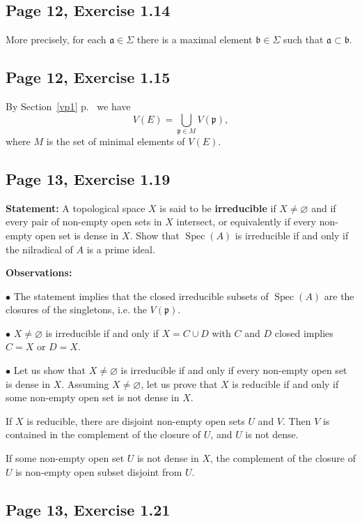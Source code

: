 \documentclass[parskip=half,fontsize=12pt]{scrartcl}%
\newcommand{\mf}{\mathfrak}
\newcommand{\bbb}{\mf b}
\newcommand{\ppp}{\mf p}
\newcommand{\bu}{\bullet}
\newcommand{\Spec}{\operatorname{Spec}}\newcommand{\Sp}{\operatorname{Spec}}
\begin{document}
\subsection{Page 12, Exercise 1.14}\label{114}%

More precisely, for each $\mf a\in\Sigma$ there is a maximal element $\bbb\in\Sigma$ such that $\mf a\subset\bbb$.

\subsection{Page 12, Exercise 1.15}\label{vp2}%

By Section~\ref{vp1} p.~\pageref{vp1} we have 
$$
V(E)=\bigcup_{\ppp\in M}V(\ppp),
$$ 
where $M$ is the set of minimal elements of $V(E)$.

\subsection{Page 13, Exercise 1.19}\label{irr}%

\textbf{Statement:} A topological space $X$ is said to be \textbf{irreducible} if $X\ne\varnothing$ and if every pair of non-empty open sets in $X$ intersect, or equivalently if every non-empty open set is dense in $X$. Show that $\Spec(A)$ is irreducible if and only if the nilradical of $A$ is a prime ideal.

\textbf{Observations:}

$\bu$ The statement implies that the closed irreducible subsets of $\Spec(A)$ are the closures of the singletons, i.e. the $V(\ppp)$. 

$\bu$ $X\ne\varnothing$ is irreducible if and only if $X=C\cup D$ with $C$ and $D$ closed implies $C=X$ or $D=X$. 

$\bu$ Let us show that $X\ne\varnothing$ is irreducible if and only if every non-empty open set is dense in $X$. Assuming $X\ne\varnothing$, let us prove that $X$ is reducible if and only if some non-empty open set is not dense in $X$. 

If $X$ is reducible, there are disjoint non-empty open sets $U$ and $V$. Then $V$ is contained in the complement of the closure of $U$, and $U$ is not dense. 

If some non-empty open set $U$ is not dense in $X$, the complement of the closure of $U$ is non-empty open subset disjoint from $U$.

\subsection{Page 13, Exercise 1.21}
\end{document}
